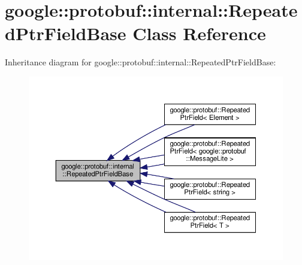 \hypertarget{classgoogle_1_1protobuf_1_1internal_1_1RepeatedPtrFieldBase}{}\section{google\+:\+:protobuf\+:\+:internal\+:\+:Repeated\+Ptr\+Field\+Base Class Reference}
\label{classgoogle_1_1protobuf_1_1internal_1_1RepeatedPtrFieldBase}


Inheritance diagram for google\+:\+:protobuf\+:\+:internal\+:\+:Repeated\+Ptr\+Field\+Base\+:
\nopagebreak
\begin{figure}[H]
\begin{center}
\leavevmode
\includegraphics[width=350pt]{classgoogle_1_1protobuf_1_1internal_1_1RepeatedPtrFieldBase__inherit__graph}
\end{center}
\end{figure}
